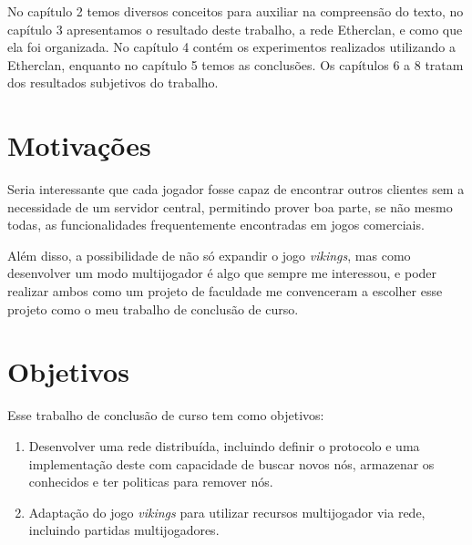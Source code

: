 No capítulo 2 temos diversos conceitos para auxiliar na compreensão do texto,
no capítulo 3 apresentamos o resultado deste trabalho, a rede Etherclan, e como
que ela foi organizada. No capítulo 4 contém os experimentos realizados utilizando
a Etherclan, enquanto no capítulo 5 temos as conclusões. Os capítulos 6 a 8 tratam
dos resultados subjetivos do trabalho.

\section{Motivações}
\label{sec:intr:motivacoes}

Seria interessante que cada jogador fosse capaz de encontrar outros clientes
sem a necessidade de um servidor central, permitindo prover boa parte, se não
mesmo todas, as funcionalidades frequentemente encontradas em jogos comerciais.

Além disso, a possibilidade de não só expandir o jogo \textit{vikings}, mas como
desenvolver um modo multijogador é algo que sempre me interessou, e poder
realizar ambos como um projeto de faculdade me convenceram a escolher esse
projeto como o meu trabalho de conclusão de curso.

\section{Objetivos}
\label{sec:intr:objetivos}

Esse trabalho de conclusão de curso tem como objetivos:

\begin{enumerate}
  \item Desenvolver uma rede distribuída, incluindo definir o protocolo e uma implementação deste com capacidade de 
    buscar novos nós, armazenar os conhecidos e ter politicas para remover nós.
    
  \item Adaptação do jogo \textit{vikings} para utilizar recursos multijogador via rede, incluindo partidas
    multijogadores.
\end{enumerate}






